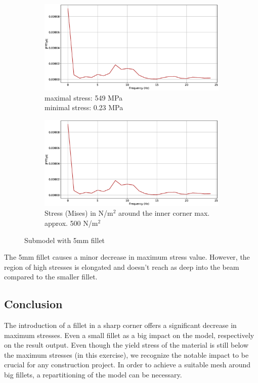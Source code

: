 \documentclass[12pt]{article}
\begin{document}
\begin{figure}[!htb]
  \centering
  \begin{subfigure}{.5\textwidth}
    \centering
    \includegraphics[width=0.95\linewidth]{pics/vib_fourier}
    \caption{maximal stress: 549 MPa \\\hspace{\textwidth}minimal stress: 0.23 MPa}
  \end{subfigure}%
  \begin{subfigure}{.5\textwidth}
    \centering
    \includegraphics[width=0.95\linewidth]{pics/vib_fourier}
    \caption{Stress (Mises) in N/m$^{2}$ around the inner corner max. approx. 500 N/m$^{2}$}
   \end{subfigure}
  \caption{Submodel with 5mm fillet}
\end{figure}

The 5mm fillet causes a minor decrease in maximum stress value. However, the region 
of high stresses is elongated and doesn't reach as deep into the beam compared to the smaller fillet.
\subsection{Conclusion}
The introduction of a fillet in a sharp corner offers a significant decrease in maximum stresses. Even a 
small fillet as a big impact on the model, respectively on the result output. Even though the yield stress 
of the material is still below the maximum stresses (in this exercise), we recognize the notable impact to 
be crucial for any construction project. In order to achieve a suitable mesh around big fillets, a 
repartitioning of the model can be necessary. 
\end{document}
